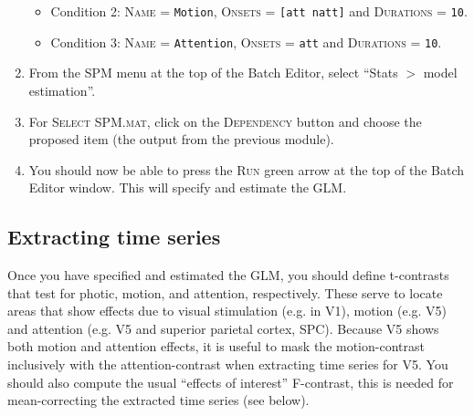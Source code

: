 \begin{enumerate}
\begin{itemize}
  \item Condition 2: \textsc{Name} = \texttt{Motion}, \textsc{Onsets} = \texttt{[att natt]} and \textsc{Durations} = \texttt{10}.
  \item Condition 3: \textsc{Name} = \texttt{Attention}, \textsc{Onsets} = \texttt{att} and \textsc{Durations} = \texttt{10}.
 \end{itemize}
 \item From the SPM menu at the top of the Batch Editor, select ``Stats $>$ model estimation''.
 \item For \textsc{Select SPM.mat}, click on the \textsc{Dependency} button and choose the proposed item (the output from the previous module).
 \item You should now be able to press the \textsc{Run} green arrow at the top of the Batch Editor window. This will specify and estimate the GLM.
\end{enumerate}

\subsection{Extracting time series}

Once you have specified and estimated the GLM, you should define t-contrasts that test for photic, motion, and attention, respectively. These serve to locate areas that show effects due to visual stimulation (e.g. in V1), motion (e.g. V5) and attention (e.g. V5 and superior parietal cortex, SPC). Because V5 shows both motion and attention effects, it is useful to mask the motion-contrast inclusively with the attention-contrast when extracting time series for V5. You should also compute the usual ``effects of interest'' F-contrast, this is needed for mean-correcting the extracted time series (see below).

